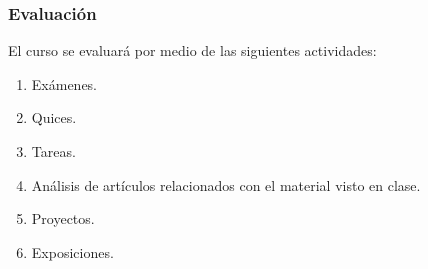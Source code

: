 \begin{refsection}
\subsubsection*{Evaluación}

El curso se evaluará por medio de las siguientes actividades:

\begin{enumerate}
\item Exámenes.
\item Quices.
\item Tareas.
\item Análisis de artículos relacionados con el material visto en clase.
\item Proyectos.
\item Exposiciones.
\end{enumerate}

\nocite{AshDD99}
\nocite{Bil95}
\nocite{Dur19}
\nocite{Gri20}
\nocite{Kal21}
\nocite{LeG22}

\printcursosbibliography
\end{refsection}

